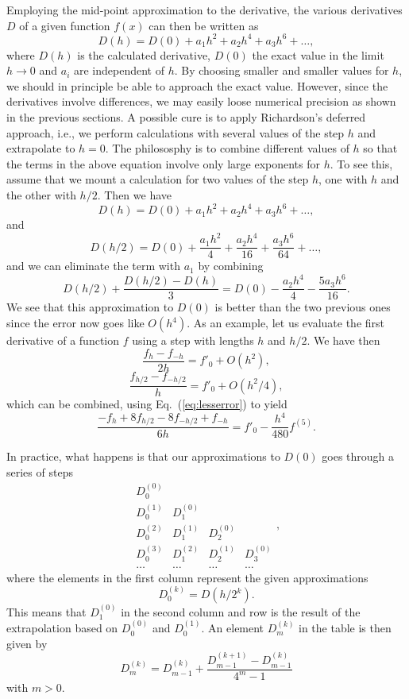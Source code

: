Employing the mid-point approximation to the derivative, 
the various derivatives $D$ of a given function $f(x)$ can then be written as 
\[
  D(h)=D(0)+a_1h^2+a_2h^4+a_3h^6+\dots,
\]
where $D(h)$ is the calculated derivative, $D(0)$ the exact value 
in the limit $h\rightarrow 0$ and $a_i$ are independent of $h$. 
By choosing smaller and smaller values for $h$, we should
in principle be able to approach the exact value. However, since the derivatives involve differences,
we may easily loose numerical precision as shown in the previous sections.
A possible cure is to apply Richardson's deferred approach, i.e., 
we perform calculations with several values of the step $h$ and extrapolate to $h=0$.
The philososphy is to combine different values of $h$ so that the terms in the above equation involve only
large exponents for $h$. To see this, assume that we mount a calculation for two
values of the step $h$, one with $h$ and the other with $h/2$. 
Then we have
\[
   D(h)=D(0)+ a_1h^2+a_2h^4+a_3h^6+\dots,
\]
and
\[
   D(h/2)=D(0)+ \frac{a_1h^2}{4}+\frac{a_2h^4}{16}+\frac{a_3h^6}{64} +\dots,
\]
and we can eliminate the term with $a_1$ by combining
\begin{equation}
D(h/2)+\frac{D(h/2)-D(h)}{3}=D(0)-\frac{a_2h^4}{4}-\frac{5a_3h^6}{16}.
\label{eq:lesserror}
\end{equation}
We see that this approximation to $D(0)$ is better than the two previous ones since
the error now goes like $O(h^4)$. 
As an example, let us evaluate the first derivative of a function $f$ 
using a step with lengths $h$ and  $h/2$. We have then
\[
   \frac{f_h-f_{-h}}{2h}=f'_0+O(h^2),
\]
\[
   \frac{f_{h/2}-f_{-h/2}}{h}=f'_0+O(h^2/4),
\]
which can be combined, using Eq.\ (\ref{eq:lesserror}) to yield
\[
\frac{-f_h+8f_{h/2}-8f_{-h/2}+f_{-h}}{6h}=f'_0-\frac{h^4}{480}f^{(5)}.
\]

In practice, what happens is that our approximations to $D(0)$ goes through a series of steps
\[
      \begin{array}{ccccc} D_0^{(0)} &  &  &  \\
                           D_0^{(1)} & D_1^{(0)} & &  \\
                           D_0^{(2)} & D_1^{(1)} &D_2^{(0)} &  \\
                           D_0^{(3)} & D_1^{(2)} &D_2^{(1)} & D_3^{(0)}  \\
                           \dots & \dots &\dots & \dots \end{array} ,
\]
where the elements in the first column represent the given approximations
\[
    D_0^{(k)}=D(h/2^k).
\]
This means that $D_1^{(0)}$ in the second column and row is the result
of the extrapolation based on $D_0^{(0)}$ and $D_0^{(1)}$.
An element $D_m^{(k)}$ in the table is then given by
\begin{equation}
   D_m^{(k)}=D_{m-1}^{(k)}+ \frac{D_{m-1}^{(k+1)}-D_{m-1}^{(k)}}{4^m-1}
   \label{eq:richardsson_ext}
\end{equation}
with $m > 0$. 

